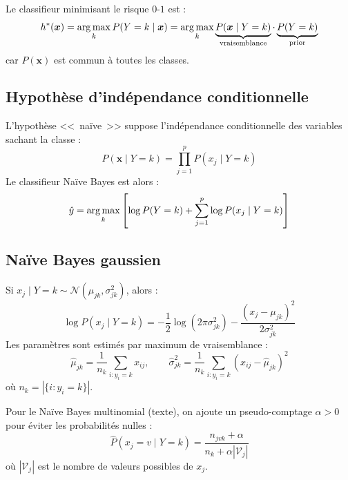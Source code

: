 \begin{theoreme}
Le classifieur minimisant le risque $0$-$1$ est :
\[
  h^*(\bm{x}) = \operatorname*{arg\,max}_{k} P(Y = k \mid \bm{x})
  = \operatorname*{arg\,max}_{k} \underbrace{P(\bm{x} \mid Y = k)}_{\text{vraisemblance}}
    \cdot \underbrace{P(Y = k)}_{\text{prior}}
\]
car $P(\bm{x})$ est commun \`a toutes les classes.
\end{theoreme}

\subsection{Hypoth\`ese d'ind\'ependance conditionnelle}

\begin{definition}
L'hypoth\`ese <<~na\"ive~>> suppose l'ind\'ependance conditionnelle des variables
sachant la classe :
\[
  P(\bm{x} \mid Y = k) = \prod_{j=1}^{p} P(x_j \mid Y = k)
\]
Le classifieur Na\"ive Bayes est alors :
\[
  \hat{y} = \operatorname*{arg\,max}_{k} \left[\log P(Y = k) + \sum_{j=1}^{p} \log P(x_j \mid Y = k)\right]
\]
\end{definition}

\subsection{Na\"ive Bayes gaussien}

\begin{proposition}
\label{prop:gnb}
Si $x_j \mid Y = k \sim \mathcal{N}(\mu_{jk}, \sigma_{jk}^2)$, alors :
\[
  \log P(x_j \mid Y=k) = -\frac{1}{2}\log(2\pi\sigma_{jk}^2)
  - \frac{(x_j - \mu_{jk})^2}{2\sigma_{jk}^2}
\]
Les param\`etres sont estim\'es par maximum de vraisemblance :
\[
  \hat{\mu}_{jk} = \frac{1}{n_k}\sum_{i: y_i = k} x_{ij}, \qquad
  \hat{\sigma}_{jk}^2 = \frac{1}{n_k}\sum_{i: y_i = k} (x_{ij} - \hat{\mu}_{jk})^2
\]
o\`u $n_k = |\{i : y_i = k\}|$.
\end{proposition}

\begin{bonnepratique}[title=\textbf{Lissage de Laplace}]
Pour le Na\"ive Bayes multinomial (texte), on ajoute un pseudo-comptage
$\alpha > 0$ pour \'eviter les probabilit\'es nulles :
\[
  \hat{P}(x_j = v \mid Y = k) = \frac{n_{jvk} + \alpha}{n_k + \alpha |\mathcal{V}_j|}
\]
o\`u $|\mathcal{V}_j|$ est le nombre de valeurs possibles de $x_j$.
\end{bonnepratique}


